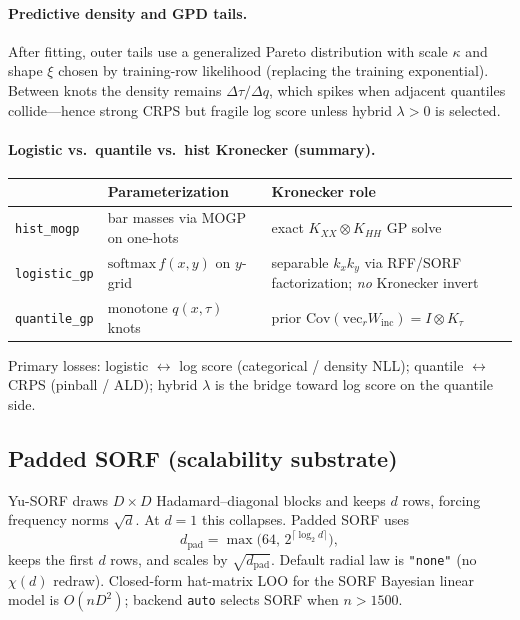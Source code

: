 \documentclass[11pt,a4paper]{article}
\theoremstyle{definition}
\begin{document}
\paragraph{Predictive density and GPD tails.}
After fitting, outer tails use a generalized Pareto distribution with scale
$\kappa$ and shape $\xi$ chosen by training-row likelihood (replacing the
training exponential). Between knots the density remains
$\Delta\tau/\Delta q$, which spikes when adjacent quantiles collide---hence
strong CRPS but fragile log score unless hybrid $\lambda>0$ is selected.

\paragraph{Logistic vs.\ quantile vs.\ hist Kronecker (summary).}
\begin{center}
\renewcommand{\arraystretch}{1.08}
\small
\begin{tabular}{@{}p{2.4cm}p{3.6cm}p{3.8cm}@{}}
\toprule
 & Parameterization & Kronecker role \\
\midrule
\texttt{hist\_mogp} &
  bar masses via MOGP on one-hots &
  exact $K_{XX}\otimes K_{HH}$ GP solve \\
\texttt{logistic\_gp} &
  $\mathrm{softmax}\,f(x,y)$ on $y$-grid &
  separable $k_x k_y$ via RFF/SORF
  factorization; \emph{no} Kronecker invert \\
\texttt{quantile\_gp} &
  monotone $q(x,\tau)$ knots &
  prior $\mathrm{Cov}(\mathrm{vec}_r W_{\mathrm{inc}})=I\otimes K_\tau$ \\
\bottomrule
\end{tabular}
\end{center}
Primary losses: logistic $\leftrightarrow$ log score (categorical / density NLL);
quantile $\leftrightarrow$ CRPS (pinball / ALD); hybrid $\lambda$ is the bridge
toward log score on the quantile side.

\subsection{Padded SORF (scalability substrate)}
\label{sec:sorf}

Yu-SORF draws $D\times D$ Hadamard--diagonal blocks and keeps $d$ rows, forcing
frequency norms $\sqrt{d}$. At $d{=}1$ this collapses. Padded SORF uses
\begin{equation}
  d_{\mathrm{pad}}=\max\bigl(64,\,2^{\lceil\log_2 d\rceil}\bigr),
\end{equation}
keeps the first $d$ rows, and scales by $\sqrt{d_{\mathrm{pad}}}$. Default radial
law is \texttt{"none"} (no $\chi(d)$ redraw). Closed-form hat-matrix LOO for the
SORF Bayesian linear model is $O(nD^2)$; backend \texttt{auto} selects SORF
when $n>1500$.
\end{document}

